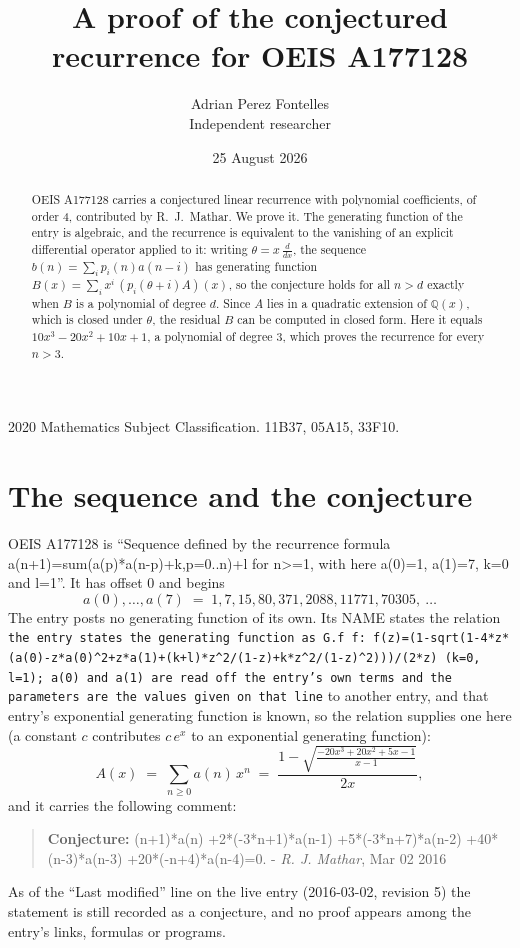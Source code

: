 \documentclass[11pt,a4paper]{article}
\title{A proof of the conjectured recurrence for OEIS A177128}
\author{Adrian Perez Fontelles\\ \small Independent researcher}
\date{25 August 2026}
\theoremstyle{plain}
\theoremstyle{definition}
\begin{document}
\maketitle

\begin{abstract}
OEIS A177128 carries a conjectured linear recurrence with polynomial coefficients, of
order 4, contributed by R.~J.~Mathar. We prove it. The generating function of the
entry is algebraic, and the recurrence is equivalent to the vanishing of an explicit
differential operator applied to it: writing $\theta=x\,\frac{d}{dx}$, the sequence
$b(n)=\sum_{i}p_{i}(n)a(n-i)$ has generating function
$B(x)=\sum_{i}x^{i}\,(p_{i}(\theta+i)A)(x)$, so the conjecture holds for all $n>d$ exactly
when $B$ is a polynomial of degree $d$. Since $A$ lies in a quadratic extension of
$\mathbb{Q}(x)$, which is closed under $\theta$, the residual $B$ can be computed in
closed form. Here it equals $10 x^{3} - 20 x^{2} + 10 x + 1$, a polynomial of degree $3$, which proves
the recurrence for every $n>3$.
\end{abstract}

\noindent\small 2020 Mathematics Subject Classification. 11B37, 05A15, 33F10.\normalsize

\section{The sequence and the conjecture}

OEIS A177128 is ``Sequence defined by the recurrence formula a(n+1)=sum(a(p)*a(n-p)+k,p=0..n)+l for n>=1, with here a(0)=1, a(1)=7, k=0 and l=1''. It has offset $0$ and begins
\[
a(0),\dots,a(7)\;=\;1, 7, 15, 80, 371, 2088, 11771, 70305,\ \dots
\]
The entry posts no generating function of its own. Its NAME states the
relation \texttt{the entry states the generating function as G.f f: f(z)=(1-sqrt(1-4*z*(a(0)-z*a(0)\textasciicircum{}2+z*a(1)+(k+l)*z\textasciicircum{}2/(1-z)+k*z\textasciicircum{}2/(1-z)\textasciicircum{}2)))/(2*z) (k=0, l=1); a(0) and a(1) are read off the entry's own terms and the parameters are the values given on that line} to another entry, and that entry's exponential generating
function is known, so the relation supplies one here (a constant $c$ contributes
$c\,e^{x}$ to an exponential generating function):
\begin{equation}\label{eq:gf}
A(x)\;=\;\sum_{n\ge 0} a(n)\,x^{n}\;=\;\frac{1 - \sqrt{\frac{- 20 x^{3} + 20 x^{2} + 5 x - 1}{x - 1}}}{2 x} ,
\end{equation}
and it carries the following comment:
\begin{quote}\small
\textbf{Conjecture:} (n+1)*a(n) +2*(-3*n+1)*a(n-1) +5*(-3*n+7)*a(n-2) +40*(n-3)*a(n-3) +20*(-n+4)*a(n-4)=0. - \emph{R. J. Mathar}, Mar 02 2016
\end{quote}
As of the ``Last modified'' line on the live entry (2016-03-02, revision 5) the
statement is still recorded as a conjecture, and no proof appears among the entry's links,
formulas or programs.
\end{document}
